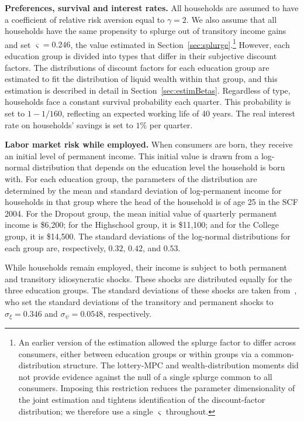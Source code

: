 \documentclass[\latexroot/\projectname]{subfiles}
\begin{document}
\textbf{Preferences, survival and interest rates.} All households are assumed to have a coefficient of relative risk aversion equal to $\gamma=2$.
We also assume that all households have the same propensity to splurge out of transitory income gains and set $\varsigma=0.246$, the value estimated in Section~\ref{sec:splurge}.\footnote{An earlier version of the estimation allowed the splurge factor to differ across consumers, either between education groups or within groups via a common-distribution structure. The lottery-MPC and wealth-distribution moments did not provide evidence against the null of a single splurge common to all consumers. Imposing this restriction reduces the parameter dimensionality of the joint estimation and tightens identification of the discount-factor distribution; we therefore use a single $\varsigma$ throughout.}
However, each education group is divided into types that differ in their subjective discount factors.
The distributions of discount factors for each education group are estimated to fit the distribution of liquid wealth within that group, and this estimation is described in detail in Section~\ref{sec:estimBetas}.
Regardless of type, households face a constant survival probability each quarter.
This probability is set to $1-1/160$, reflecting an expected working life of 40 years.
The real interest rate on households' savings is set to $1\%$ per quarter.


\textbf{Labor market risk while employed.} When consumers are born, they receive an initial level of permanent income.
This initial value is drawn from a log-normal distribution that depends on the education level the household is born with.
For each education group, the parameters of the distribution are determined by the mean and standard deviation of log-permanent income for households in that group where the head of the household is of age 25 in the SCF 2004.
For the Dropout group, the mean initial value of quarterly permanent income is \$6,200; for the Highschool group, it is \$11,100; and for the College group, it is \$14,500.
The standard deviations of the log-normal distributions for each group are, respectively, $0.32$, $0.42$, and $0.53$.

While households remain employed, their income is subject to both permanent and transitory idiosyncratic shocks.
These shocks are distributed equally for the three education groups.
The standard deviations of these shocks are taken from~\cite{carroll2020sticky}, who set the standard deviations of the transitory and permanent shocks to $\sigma_\xi=0.346$ and $\sigma_\psi=0.0548$, respectively.
\end{document}
